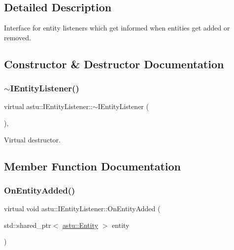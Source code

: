 \subsection{Detailed Description}
Interface for entity listeners which get informed when entities get added or removed. 

\subsection{Constructor \& Destructor Documentation}
\mbox{\label{classastu_1_1IEntityListener_ad3e01cd267ff128c2176d06897c8c7b6}} 
\subsubsection{\texorpdfstring{$\sim$\+I\+Entity\+Listener()}{~IEntityListener()}}
{\footnotesize\ttfamily virtual astu\+::\+I\+Entity\+Listener\+::$\sim$\+I\+Entity\+Listener (\begin{DoxyParamCaption}{ }\end{DoxyParamCaption})\hspace{0.3cm}{\ttfamily [inline]}, {\ttfamily [virtual]}}

Virtual destructor. 

\subsection{Member Function Documentation}
\mbox{\label{classastu_1_1IEntityListener_afa087302fdf0bd999297b0d35ceb1f61}} 
\subsubsection{\texorpdfstring{On\+Entity\+Added()}{OnEntityAdded()}}
{\footnotesize\ttfamily virtual void astu\+::\+I\+Entity\+Listener\+::\+On\+Entity\+Added (\begin{DoxyParamCaption}\item[{std\+::shared\+\_\+ptr$<$ \hyperlink{classastu_1_1Entity}{astu\+::\+Entity} $>$}]{entity }\end{DoxyParamCaption})\hspace{0.3cm}{\ttfamily [pure virtual]}}

